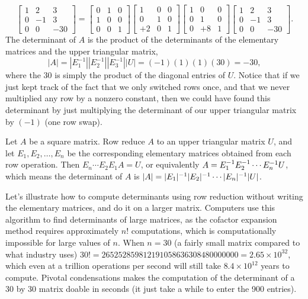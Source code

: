\begin{example}
$$\begin{bmatrix}
 1 & 2 & 3 \\
 0 & -1 & 3 \\
 0 & 0 & -30
\end{bmatrix}=
\begin{bmatrix}
 0 & 1 & 0 \\
 1 & 0 & 0 \\
 0 & 0 & 1
\end{bmatrix}
\begin{bmatrix}
 1 & 0 & 0 \\
 0 & 1 & 0 \\
 +2 & 0 & 1
\end{bmatrix}
\begin{bmatrix}
 1 & 0 & 0 \\
 0 & 1 & 0 \\
 0 & +8 & 1
\end{bmatrix}
\begin{bmatrix}
 1 & 2 & 3 \\
 0 & -1 & 3 \\
 0 & 0 & -30
\end{bmatrix}.
$$
The determinant of $A$ is the product of the determinants of the elementary matrices and the upper triangular matrix, $$|A|=|E_1^{-1}||E_2^{-1}||E_3^{-1}||U|=(-1)(1)(1)(30)=-30,$$ where the 30 is simply the product of the diagonal entries of $U$. 
Notice that if we just kept track of the fact that we only switched rows once, and that we never multiplied any row by a nonzero constant, then we could have found this determinant by just multiplying the determinant of our upper triangular matrix by $(-1)$ (one row swap).
\end{example}  

\begin{theorem}
Let $A$ be a square matrix. Row reduce $A$ to an upper triangular matrix $U$, and let $E_1, E_2, \ldots, E_n$ be the corresponding elementary matrices obtained from each row operation.  
Then $E_n\cdots E_2E_1A=U$, or equivalently $A=E_1^{-1} E_2^{-1} \cdots E_n^{-1} U$, which means the determinant of $A$ is $|A|=|E_1|^{-1} |E_2|^{-1} \cdots |E_n|^{-1} |U|$.  
\end{theorem}

Let's illustrate how to compute determinants using row reduction without writing the elementary matrices, and do it on a larger matrix. Computers use this algorithm to find determinants of large matrices, as the cofactor expansion method requires approximately $n!$ computations, which is computationally impossible for large values of $n$. When $n=30$ (a fairly small matrix compared to what industry uses) $30!=265252859812191058636308480000000 = 2.65\times 10^32$, which even at a trillion operations per second will still take $8.4\times 10^12$ years to compute. Pivotal condensations makes the computation of the determinant of a 30 by 30 matrix doable in seconds (it just take a while to enter the 900 entries).

